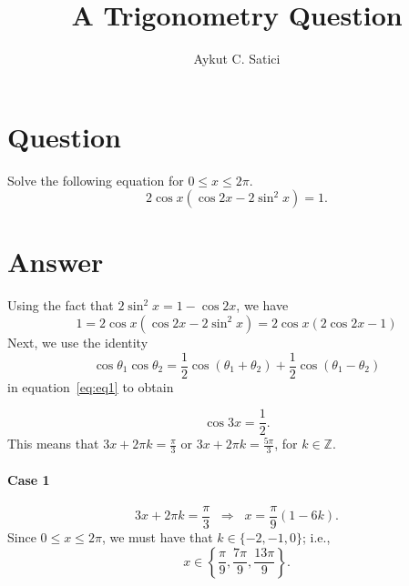 \documentclass[journal,twoside,web]{ieeecolor}
\begin{document}
\title{A Trigonometry Question} 
\author{
Aykut C. Satici  %
}
\maketitle

\section{Question}
Solve the following equation for $0 \leq x \leq 2\pi$.
\[ 2\cos{x} \left( \cos{2x} - 2\sin^2{x} \right) = 1. \]

\section{Answer}

Using the fact that $2\sin^2{x} = 1 - \cos{2x}$, we have
\begin{equation}
  1 = 2 \cos{x} \left( \cos{2x} - 2\sin^2{x} \right) = 2\cos{x}\left(2\cos{2x} - 1\right)
  \label{eq:eq1}
\end{equation}
%
Next, we use the identity
\[ \cos{\theta_1}\cos{\theta_2} = \frac{1}{2}\cos{(\theta_1 + \theta_2)} +
\frac{1}{2}\cos{(\theta_1 -\theta_2)} \]
%
in equation~\eqref{eq:eq1} to obtain

\begin{equation}
  \cos{3x} = \frac{1}{2}.
  \label{eq:eq2}
\end{equation}
%
This means that  $3x + 2\pi k = \frac{\pi}{3}$ or $3x + 2\pi k =
\frac{5\pi}{3}$, for $k \in \mathbb{Z}$.

\paragraph{Case 1}
\[ 3x + 2\pi k = \frac{\pi}{3} \;\; \Rightarrow \;\; x = \frac{\pi}{9}( 1 - 6k ). \]
%
Since $0 \leq x \leq 2\pi$, we must have that $k \in \{-2, -1, 0\}$; i.e., 
\[ x \in \left\{ \frac{\pi}{9}, \frac{7\pi}{9}, \frac{13\pi}{9} \right\}. \]
  
\end{document}
